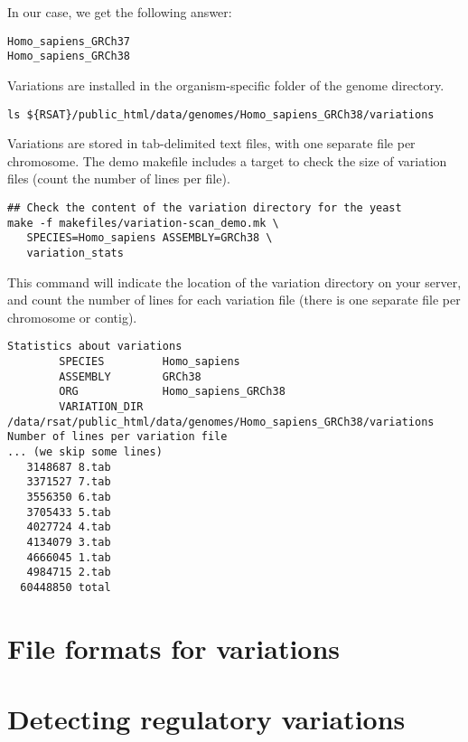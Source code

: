 In our case, we get the following answer:

{\color{OliveGreen} \begin{footnotesize} 
\begin{verbatim}
Homo_sapiens_GRCh37
Homo_sapiens_GRCh38
\end{verbatim} \end{footnotesize}
}

Variations are installed in the organism-specific folder of the genome
directory.

\begin{lstlisting}
ls ${RSAT}/public_html/data/genomes/Homo_sapiens_GRCh38/variations
\end{lstlisting}

Variations are stored in tab-delimited text files, with one separate file
per chromosome.  The demo makefile includes a target to check the size
of variation files (count the number of lines per file).

\begin{lstlisting}
## Check the content of the variation directory for the yeast
make -f makefiles/variation-scan_demo.mk \
   SPECIES=Homo_sapiens ASSEMBLY=GRCh38 \
   variation_stats
\end{lstlisting}

This command will indicate the location of the variation directory on
your \RSAT server, and count the number of lines for each variation
file (there is one separate file per chromosome or contig).


{\color{OliveGreen} \begin{footnotesize} 
\begin{verbatim}
Statistics about variations
        SPECIES         Homo_sapiens
        ASSEMBLY        GRCh38
        ORG             Homo_sapiens_GRCh38
        VARIATION_DIR   /data/rsat/public_html/data/genomes/Homo_sapiens_GRCh38/variations
Number of lines per variation file
... (we skip some lines)
   3148687 8.tab
   3371527 7.tab
   3556350 6.tab
   3705433 5.tab
   4027724 4.tab
   4134079 3.tab
   4666045 1.tab
   4984715 2.tab
  60448850 total
\end{verbatim} \end{footnotesize}
}

\section{File formats for variations}



\section{Detecting regulatory variations}

